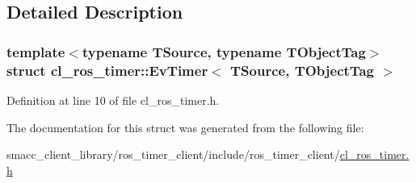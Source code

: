 \subsection{Detailed Description}
\subsubsection*{template$<$typename T\+Source, typename T\+Object\+Tag$>$\newline
struct cl\+\_\+ros\+\_\+timer\+::\+Ev\+Timer$<$ T\+Source, T\+Object\+Tag $>$}



Definition at line 10 of file cl\+\_\+ros\+\_\+timer.\+h.



The documentation for this struct was generated from the following file\+:\begin{DoxyCompactItemize}
\item 
smacc\+\_\+client\+\_\+library/ros\+\_\+timer\+\_\+client/include/ros\+\_\+timer\+\_\+client/\hyperlink{cl__ros__timer_8h}{cl\+\_\+ros\+\_\+timer.\+h}\end{DoxyCompactItemize}
